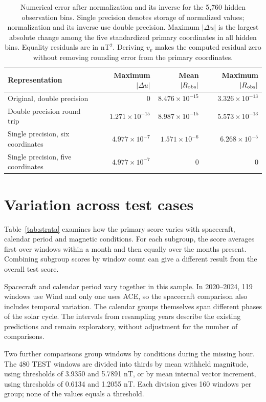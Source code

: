 \documentclass{article}
\begin{document}
\begin{table}[t]
\centering
\caption{Numerical error after normalization and its inverse for the 5{,}760 hidden observation bins. Single precision denotes storage of normalized values; normalization and its inverse use double precision. Maximum $|\Delta u|$ is the largest absolute change among the five standardized primary coordinates in all hidden bins. Equality residuals are in nT$^2$. Deriving $v_v$ makes the computed residual zero without removing rounding error from the primary coordinates.}
\label{tab:roundtrip}
\begin{tabular}{lrrr}
\toprule
Representation & \parbox[c]{16mm}{\centering Maximum $|\Delta u|$} & Mean $|R_{\rm obs}|$ & \parbox[c]{16mm}{\centering Maximum $|R_{\rm obs}|$} \\
\midrule
Original, double precision & 0 & $8.476\times10^{-15}$ & $3.326\times10^{-13}$ \\
Double precision round trip & $1.271\times10^{-15}$ & $8.987\times10^{-15}$ & $5.573\times10^{-13}$ \\
Single precision, six coordinates & $4.977\times10^{-7}$ & $1.571\times10^{-6}$ & $6.268\times10^{-5}$ \\
Single precision, five coordinates & $4.977\times10^{-7}$ & 0 & 0 \\
\bottomrule
\end{tabular}
\end{table}

\section{Variation across test cases}
\label{app:strata}

Table~\ref{tab:strata} examines how the primary score varies with spacecraft, calendar period and magnetic conditions. For each subgroup, the score averages first over windows within a month and then equally over the months present. Combining subgroup scores by window count can give a different result from the overall test score.

Spacecraft and calendar period vary together in this sample. In 2020--2024, 119 windows use Wind and only one uses ACE, so the spacecraft comparison also includes temporal variation. The calendar groups themselves span different phases of the solar cycle. The intervals from resampling years describe the existing predictions and remain exploratory, without adjustment for the number of comparisons.

Two further comparisons group windows by conditions during the missing hour. The 480 TEST windows are divided into thirds by mean withheld magnitude, using thresholds of 3.9350 and 5.7891 nT, or by mean internal vector increment, using thresholds of 0.6134 and 1.2055 nT. Each division gives 160 windows per group; none of the values equals a threshold.
\end{document}
